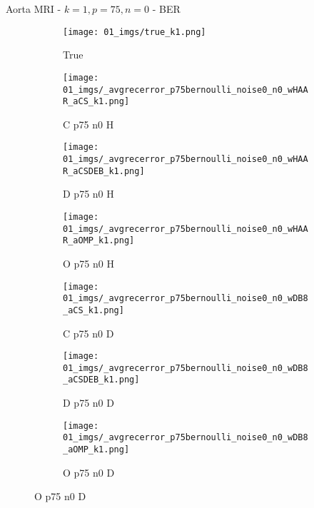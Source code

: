 \begin{frame}{Aorta MRI - $k=1,p=75,n=0$ - BER}{}
\begin{figure}
\begin{subfigure}{0.13\textwidth}
\texttt{[image: 01\_imgs/true\_k1.png]}
\caption*{\tiny True}
\end{subfigure}
\begin{subfigure}{0.13\textwidth}
\texttt{[image: 01\_imgs/\_avgrecerror\_p75bernoulli\_noise0\_n0\_wHAAR\_aCS\_k1.png]}
\caption*{\tiny C p75 n0 H}
\end{subfigure}
\begin{subfigure}{0.13\textwidth}
\texttt{[image: 01\_imgs/\_avgrecerror\_p75bernoulli\_noise0\_n0\_wHAAR\_aCSDEB\_k1.png]}
\caption*{\tiny D p75 n0 H}
\end{subfigure}
\begin{subfigure}{0.13\textwidth}
\texttt{[image: 01\_imgs/\_avgrecerror\_p75bernoulli\_noise0\_n0\_wHAAR\_aOMP\_k1.png]}
\caption*{\tiny O p75 n0 H}
\end{subfigure}
\begin{subfigure}{0.13\textwidth}
\texttt{[image: 01\_imgs/\_avgrecerror\_p75bernoulli\_noise0\_n0\_wDB8\_aCS\_k1.png]}
\caption*{\tiny C p75 n0 D}
\end{subfigure}
\begin{subfigure}{0.13\textwidth}
\texttt{[image: 01\_imgs/\_avgrecerror\_p75bernoulli\_noise0\_n0\_wDB8\_aCSDEB\_k1.png]}
\caption*{\tiny D p75 n0 D}
\end{subfigure}
\begin{subfigure}{0.13\textwidth}
\texttt{[image: 01\_imgs/\_avgrecerror\_p75bernoulli\_noise0\_n0\_wDB8\_aOMP\_k1.png]}
\caption*{\tiny O p75 n0 D}
\end{subfigure}

\vspace{5pt}


\end{figure}
\end{frame}
